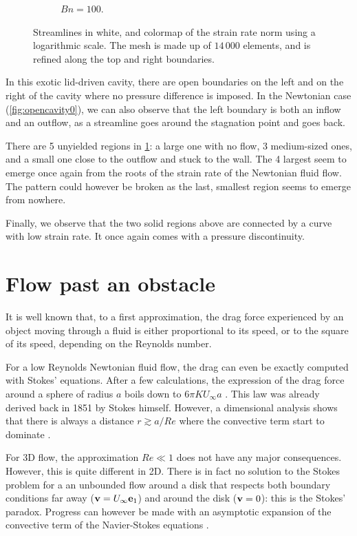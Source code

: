 \documentclass[11 pt]{report}
\begin{document}
\begin{figure}[h]
\begin{subfigure}[t]{0.495\textwidth}
        \caption{$Bn=100$.}
        \label{fig:opencavity100}
    \end{subfigure}
    \caption{Streamlines in white, and colormap of the strain rate norm using a logarithmic scale. The mesh is made up of $14\,000$ elements, and is refined along the top and right boundaries.}
    \label{fig:opencavity}
\end{figure} 

In this exotic lid-driven cavity, there are open boundaries on the left and on the right of the cavity where no pressure difference is imposed. In the Newtonian case (\cref{fig:opencavity0}), we can also observe that the left boundary is both an inflow and an outflow, as a streamline goes around the stagnation point and goes back. 

There are 5 unyielded regions in \cref{fig:opencavity100}: a large one with no flow, 3 medium-sized ones, and a small one close to the outflow and stuck to the wall. The 4 largest seem to emerge once again from the roots of the strain rate of the Newtonian fluid flow. The pattern could however be broken as the last, smallest region seems to emerge from nowhere.

Finally, we observe that the two solid regions above are connected by a curve with low strain rate. It once again comes with a pressure discontinuity.

\section{Flow past an obstacle}

It is well known that, to a first approximation, the drag force experienced by an object moving through a fluid is either proportional to its speed, or to the square of its speed, depending on the Reynolds number.

For a low Reynolds Newtonian fluid flow, the drag can even be exactly computed with Stokes' equations. After a few calculations, the expression of the drag force around a sphere of radius $a$ boils down to $6\pi K U_{\infty} a$ \cite{stokesSphere,stokesExpansion}. This law was already derived back in 1851 by Stokes himself. However, a dimensional analysis shows that there is always a distance $r \gtrsim a / Re$ where the convective term start to dominate \cite{lamb1945hydrodynamics,stokesExpansion}. 

For 3D flow, the approximation $Re\ll 1$ does not have any major consequences. However, this is quite different in 2D. There is in fact no solution to the Stokes problem for a an unbounded flow around a disk that respects both boundary conditions far away ($\mathbf{v}=U_{\infty}\mathbf{e}_1$) and around the disk ($\mathbf{v}=0$): this is the Stokes' paradox. Progress can however be made with an asymptotic expansion of the convective term of the Navier-Stokes equations \cite{stokesExpansion}.
\end{document}
